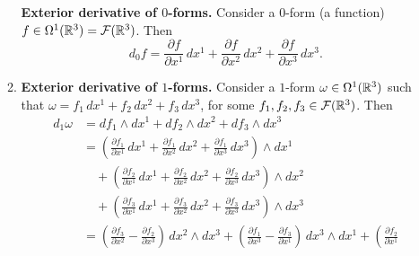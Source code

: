 \begin{example}
\begin{enumerate}
\begin{enumerate}
          \textbf{Exterior derivative of $0$-forms.}
          Consider a $0$-form (a function)
          $f \in \Omega^1(\mathbb{R}^3) = \mathcal{F}(\mathbb{R}^3)$.
          Then
          \begin{equation}
            d_0 f
            = \frac{\partial f}{\partial x^1}\, d x^1
            + \frac{\partial f}{\partial x^2}\, d x^2
            + \frac{\partial f}{\partial x^3}\, d x^3.
          \end{equation}
        \item
          \textbf{Exterior derivative of $1$-forms.}
          Consider a $1$-form $\omega \in \Omega^1(\mathbb{R}^3)$ such that
          $\omega = f_1\, d x^1 + f_2\, d x^2 + f_3\, d x^3$,
          for some $f_1, f_2, f_3 \in \mathcal{F}(\mathbb{R}^3)$.
          Then
          \begin{equation}
            \begin{split}
              d_1 \omega
              & = d f_1 \wedge d x^1 + d f_2 \wedge d x^2 + d f_3 \wedge d x^3
                \\
              & =
                \left(
                  \frac{\partial f_1}{\partial x^1}\, d x^1
                  + \frac{\partial f_1}{\partial x^2}\, d x^2
                  + \frac{\partial f_1}{\partial x^3}\, d x^3
                \right)
                \wedge d x^1 \\
              & \quad
                +
                \left(
                  \frac{\partial f_2}{\partial x^1}\, d x^1
                  + \frac{\partial f_2}{\partial x^2}\, d x^2
                  + \frac{\partial f_2}{\partial x^3}\, d x^3
                \right)
                \wedge d x^2 \\
              & \quad
                +
                \left(
                  \frac{\partial f_3}{\partial x^1}\, d x^1
                  + \frac{\partial f_3}{\partial x^2}\, d x^2
                  + \frac{\partial f_3}{\partial x^3}\, d x^3
                \right)
                \wedge d x^3
                \\
              & =
                \left(
                  \frac{\partial f_3}{\partial x^2}
                  - \frac{\partial f_2}{\partial x^3}
                \right)\,
                d x^2 \wedge d x^3
                +
                \left(
                  \frac{\partial f_1}{\partial x^3}
                  - \frac{\partial f_3}{\partial x^1}
                \right)\,
                d x^3 \wedge d x^1
                +
                \left(
                  \frac{\partial f_2}{\partial x^1}

\end{split}
\end{equation}
\end{enumerate}
\end{enumerate}
\end{example}
